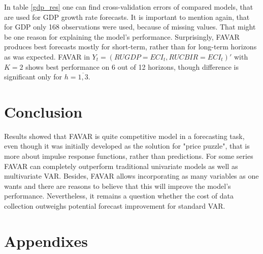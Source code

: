 \documentclass[a4paper, 14pt]{article}
\begin{document}
In table \ref{gdp_res} one can find cross-validation errors of compared models, that are used for GDP growth rate forecasts. It is important to mention again, that for GDP only 168 observations were used, because of missing values. That might be one reason for explaining the model's performance. Surprisingly, FAVAR produces best forecasts mostly for short-term, rather than for long-term horizons as was expected. FAVAR in $Y_t=(RUGDP=ECI_t, RUCBIR=ECI_t)'$ with $K=2$ shows best performance on 6 out of 12 horizons, though difference is significant only for $h=\overline{1,3}$.

\section{Conclusion}
Results showed that FAVAR is quite competitive model in a forecasting task, even though it was initially developed as the solution for "price puzzle", that is more about impulse response functions, rather than predictions. For some series FAVAR can completely outperform traditional univariate models as well as multivariate VAR. Besides, FAVAR allows incorporating as many variables as one wants and there are reasons to believe that this will improve the model's performance. Nevertheless, it remains a question whether the cost of data collection outweighs potential forecast improvement for standard VAR. 



\newpage
\section*{Appendixes}
\appendix
\end{document}
